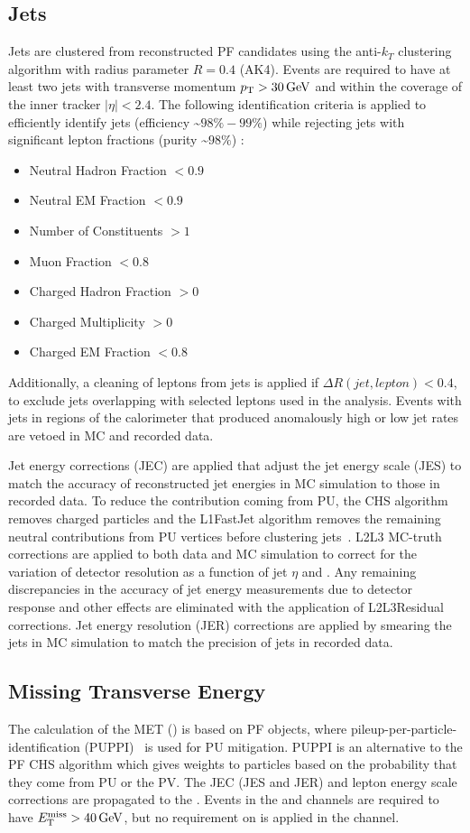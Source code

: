 \subsection{Jets}
Jets are clustered from reconstructed PF candidates using the anti-$k_T$ clustering algorithm with radius parameter $R = 0.4$ (AK4).
Events are required to have at least two jets with transverse momentum $\pT > \SI{30}{\GeV}$ and within the coverage of the inner tracker $\vert \eta \vert < 2.4$. 
The following identification criteria is applied to efficiently identify jets (efficiency \sim $98\% - 99\%$) while rejecting jets with significant lepton fractions (purity \sim $98\%$) :
\begin{itemize}
\item Neutral Hadron Fraction $<0.9$
\item Neutral EM Fraction $<0.9$
\item Number of Constituents $>1$
\item Muon Fraction $<0.8$
\item Charged Hadron Fraction $>0$
\item Charged Multiplicity $> 0$
\item Charged EM Fraction $<0.8$ 
\end{itemize}
Additionally, a cleaning of leptons from jets is applied if $\Delta R(jet,lepton)<0.4$, to exclude jets overlapping with selected leptons used in the analysis.
Events with jets in regions of the calorimeter that produced anomalously high or low jet rates are vetoed in MC and recorded data.

Jet energy corrections (JEC) are applied that adjust the jet energy scale (JES) to match the accuracy of reconstructed jet energies in MC simulation to those in recorded data.
To reduce the contribution coming from PU, the CHS algorithm removes charged particles and the L1FastJet algorithm removes the remaining neutral contributions from PU vertices before clustering jets~\cite{bib:JME18001}.
L2L3 MC-truth corrections are applied to both data and MC simulation to correct for the variation of detector resolution as a function of jet $\eta$ and \pT.
Any remaining discrepancies in the accuracy of jet energy measurements due to detector response and other effects are eliminated with the application of L2L3Residual corrections.
Jet energy resolution (JER) corrections are applied by smearing the jets in MC simulation to match the precision of jets in recorded data.

\subsection{Missing Transverse Energy}
The calculation of the MET (\ETmiss) is based on PF objects, where pileup-per-particle-identification (PUPPI)~\cite{bib:PUPPI} is used for PU mitigation.
PUPPI is an alternative to the PF CHS algorithm which gives weights to particles based on the probability that they come from PU or the PV.
The JEC (JES and JER) and lepton energy scale corrections are propagated to the \ETmiss.
Events in the \mumu and \ee channels are required to have $\ETmiss > \SI{40}{\GeV}$, but no requirement on \ETmiss is applied in the \emu channel.

